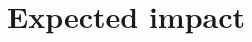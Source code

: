 \documentclass[sigconf]{acmart}
\newcommand{\inlinetodo}[1]{\todo[inline]{#1}}
\theoremstyle{definition}
\newtheorem{definition}{Definition}
\begin{document}






\section{Expected impact}



\end{document}
